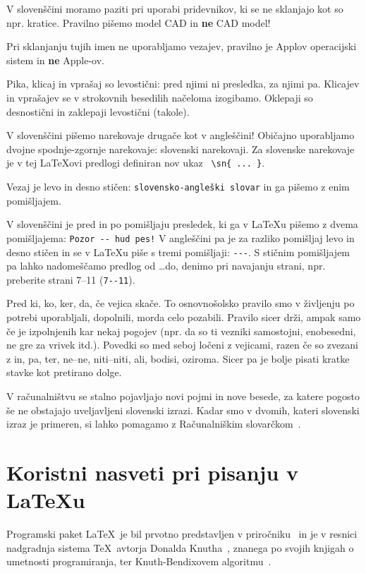 \documentclass{feridiploma}
\begin{document}
	V slovenščini moramo paziti  pri uporabi pridevnikov, ki se ne sklanjajo kot so npr. kratice. 
	Pravilno pišemo model CAD in \textbf{ne} CAD model!
	
	Pri sklanjanju tujih imen ne uporabljamo vezajev, pravilno je Applov operacijski sistem in \textbf{ne} Apple-ov.
	
	Pika, klicaj in vprašaj so levostični: pred njimi ni presledka, za njimi pa. 
	Klicajev in vprašajev se v strokovnih besedilih načeloma izogibamo. Oklepaji so desnostični in zaklepaji levostični (takole).
	
	V slovenščini pišemo narekovaje drugače kot v angleščini!   
	Običajno uporabljamo dvojne spodnje-zgornje narekovaje: {slovenski narekovaji}.
	Za slovenske narekovaje je v tej LaTeXovi predlogi definiran nov ukaz \verb+ \sn{ ... }+.
	
	Vezaj  je levo in desno stičen: \verb=slovensko-angleški slovar= in ga pišemo z enim pomišljajem.
	
	V slovenščini je pred in po pomišljaju presledek, ki ga v LaTeXu pišemo z dvema pomišljajema: \verb=Pozor -- hud pes!=
	V angleščini pa je za razliko pomišljaj levo in desno stičen in se v LaTeXu piše s tremi  pomišljaji: \verb=---=.
	S stičnim pomišljajem pa lahko nadomeščamo predlog od \dots do, denimo pri navajanju strani, npr. preberite strani 7--11 (\verb=7--11=).
	
	{Pred ki, ko, ker, da, če vejica skače}. To osnovnošolsko pravilo smo v življenju po potrebi uporabljali, dopolnili, morda celo pozabili. 
	Pravilo sicer drži, ampak samo če je izpolnjenih kar nekaj pogojev (npr. da so ti vezniki samostojni, enobesedni, ne gre za vrivek itd.).
	Povedki so med seboj ločeni z vejicami, razen če so zvezani z in, pa, ter, ne–ne, niti–niti, ali, bodisi, oziroma.
	Sicer pa je bolje pisati kratke stavke kot pretirano dolge.
	
	V računalništvu se stalno pojavljajo novi pojmi in nove besede, za katere pogosto še ne obstajajo uveljavljeni slovenski izrazi.
	Kadar smo v dvomih, kateri slovenski izraz je primeren, si lahko pomagamo z Računalniškim slovarčkom~\cite{slovarcek}.
	
	\chapter{Koristni nasveti pri pisanju v \LaTeX{u}}   %
	\label{latex}
	
	Programski paket \LaTeX\ je bil prvotno predstavljen v priročniku~\cite{lamport} in je v resnici nadgradnja sistema \TeX\ avtorja Donalda Knutha~\cite{knuth}, 
	znanega po svojih knjigah o umetnosti programiranja, 
	ter Knuth-Bendixovem algoritmu~\cite{knuth1983simple}.
	
\end{document}
